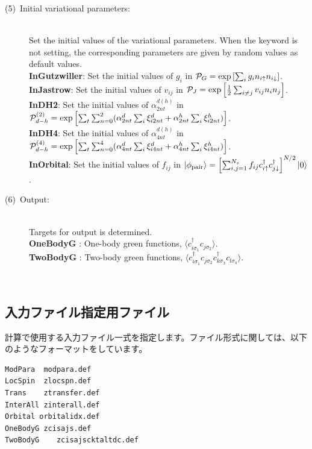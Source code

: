 \begin{description}
\item[(5)~Initial variational parameters:]
~\\ Set the initial values of the variational parameters. When the keyword is not setting, the corresponding parameters are given by random values as default values.
~\\{\bf InGutzwiller}: Set the initial values of $g_i$ in ${\cal P}_G=\exp\left[ \sum_i g_i n_{i\uparrow} n_{i\downarrow} \right]$.
~\\{\bf InJastrow}: Set the initial values of $v_{ij}$ in ${\cal P}_J=\exp\left[\frac{1}{2} \sum_{i\neq j} v_{ij} n_i n_j\right]$.
~\\{\bf InDH2}:  Set the initial values of $\alpha_{2nt}^{d(h)}$ in ${\cal P}_{d-h}^{(2)}= \exp \left[ \sum_t \sum_{n=0}^2 (\alpha_{2nt}^d \sum_{i}\xi_{i2nt}^d+\alpha_{2nt}^h \sum_{i}\xi_{i2nt}^h)\right]$.
~\\{\bf InDH4}:  Set the initial values of $\alpha_{4nt}^{d(h)}$ in ${\cal P}_{d-h}^{(4)}= \exp \left[ \sum_t \sum_{n=0}^4 (\alpha_{4nt}^d \sum_{i}\xi_{i4nt}^d+\alpha_{4nt}^h \sum_{i}\xi_{i4nt}^h)\right]$.
~\\{\bf InOrbital}: Set the initial values of $ f_{ij}$ in $|\phi_{\rm pair} \rangle = \left[\sum_{i, j=1}^{N_s} f_{ij}c_{i\uparrow}^{\dag}c_{j\downarrow}^{\dag} \right]^{N/2}|0 \rangle$.

\item[(6)~Output:]
~\\
Targets for output is determined.
~\\{\bf OneBodyG }: One-body green functions,  $\langle c^{\dagger}_{i\sigma_1}c_{j\sigma_2}\rangle$.
~\\{\bf TwoBodyG }: Two-body green functions,  $\langle c^{\dagger}_{i\sigma_1}c_{j\sigma_2}c^{\dagger}_{k \sigma_3}c_{l\sigma_4}\rangle$.
\end{description}
\newpage
~\subsection{入力ファイル指定用ファイル}
\label{Subsec:InputFileList}
計算で使用する入力ファイル一式を指定します。ファイル形式に関しては、以下のようなフォーマットをしています。\\
\begin{minipage}{10cm}
\begin{screen}
\begin{verbatim}
ModPara  modpara.def
LocSpin  zlocspn.def
Trans    ztransfer.def
InterAll zinterall.def
Orbital orbitalidx.def
OneBodyG zcisajs.def
TwoBodyG	zcisajscktaltdc.def
\end{verbatim}
\end{screen}
\end{minipage}
\\
